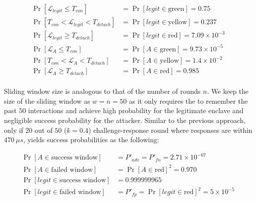 \ifusenix
\vspace{-2pt}
\else
\fi
\begin{align*}
\Pr[\mathcal{L}_{legit}\leq T_{con}]&=\Pr[legit\in\text{green}]=0.75\\
\Pr[T_{con}< \mathcal{L}_{legit}< T_{detach}]&=\Pr[legit\in\text{yellow}]= 0.237\\
\Pr[\mathcal{L}_{legit}\geq T_{detach}]&=\Pr[legit\in\text{red}]= 7.09\times10^{-3}\\
\Pr[\mathcal{L}_{A}\leq T_{con}]&=\Pr[A\in\text{green}]=9.73\times10^{-5}\\
\Pr[T_{con}< \mathcal{L}_{A}< T_{detach}]&=\Pr[A\in\text{yellow}]= 1.4\times10^{-2}\\
\Pr[\mathcal{L}_{A}\geq T_{detach}]&=\Pr[A\in\text{red}]= 0.985\\
\end{align*} 
\ifusenix
\vspace{-20pt}
\else
\fi

\ifusenix
\vspace{-15pt}
\else
\fi
{} Sliding window size is analogous to that of the number of rounds $n$. We keep  the size of the sliding window as $w=n=50$ as it only requires the \device to remember the past $50$ interactions and achieve high probability for the legitimate enclave and negligible success probability for the attacker. Similar to the previous approach, only if $20$ out of $50$ ($k=0.4$) challenge-response round where responses are within $470\ \mu s$, \name yields success probabilities as the following:

\ifusenix
\vspace{-4pt}
\else
\fi

\begin{align*}
 \Pr[A \in \text{success window}]&=P'_{adv} = P'_{fn}= 2.71\times 10^{-67}\\
 \Pr[A \in \text{failed window}]&=\Pr[A\in\text{red}]^2=0.970\\
 \Pr[legit \in \text{success window}]&=0.999999965\\
 \Pr[legit \in \text{failed window}]&=P'_{fp}=\Pr[legit\in\text{red}]^2=5\times10^{-5}
\end{align*}
\ifusenix
\vspace{-4pt}
\else
\fi



